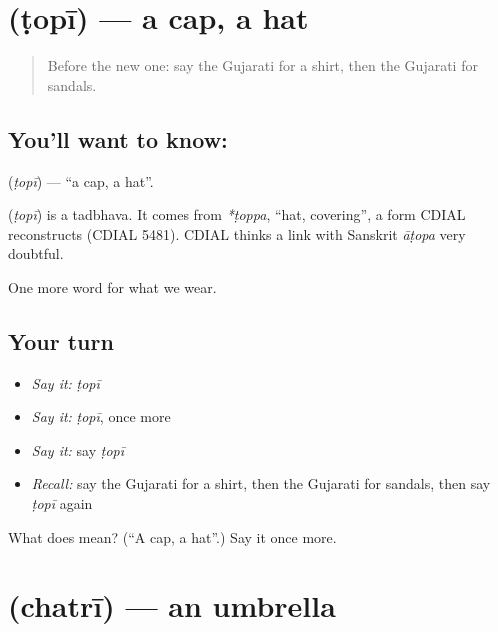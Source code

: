 \section[\texorpdfstring{\gu{ટોપી} (ṭopī)}{ટોપી (ṭopī)}]{ (ṭopī) — a cap, a hat}

\label{lesson:GU-C87-cap}



\begin{quote}
Before the new one: say the Gujarati for a shirt, then the Gujarati for sandals.
\end{quote}

\subsection*{You'll want to know: }
\textbf{} (\emph{ṭopī}) — \textquotedblleft{}a cap, a hat\textquotedblright{}.

\begin{cousinweb}
\textbf{} (\emph{ṭopī}) is a tadbhava. It comes from \emph{*ṭoppa}, \textquotedblleft{}hat, covering\textquotedblright{}, a form CDIAL reconstructs (CDIAL 5481). CDIAL thinks a link with Sanskrit \emph{āṭopa} very doubtful.
\end{cousinweb}

\begin{grammarlens}[title={What you've built}]
One more word for what we wear.
\end{grammarlens}

\subsection*{Your turn}
\begin{itemize}
\raggedright
  \item \emph{Say it:} \emph{ṭopī}
  \item \emph{Say it:} \emph{ṭopī}, once more
  \item \emph{Say it:} say \emph{ṭopī}
  \item \emph{Recall:} say the Gujarati for a shirt, then the Gujarati for sandals, then say \emph{ṭopī} again
\end{itemize}

\begin{tcolorbox}[breakable,colback=teal!4,colframe=teal!35!black,title={Before you move on}]
What does  mean? (\textquotedblleft{}A cap, a hat\textquotedblright{}.) Say it once more.
\end{tcolorbox}
\section[\texorpdfstring{\gu{છત્રી} (chatrī)}{છત્રી (chatrī)}]{ (chatrī) — an umbrella}


